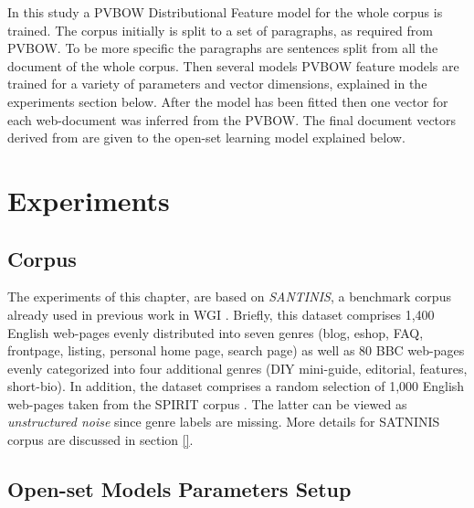 In this study a PVBOW Distributional Feature model for the whole corpus is trained. The corpus initially is split to a set of paragraphs, as required from PVBOW. To be more specific the paragraphs are sentences split from all the document of the whole corpus. Then several models PVBOW feature models are trained for a variety of parameters and vector dimensions, explained in the experiments section below. After the model has been fitted then one vector for each web-document was inferred from the PVBOW. The final document vectors derived from  are given to the open-set learning model explained below. 

\section{Experiments}\label{chap:word_embeddings:sec:experiments_setup}

\subsection{Corpus}\label{chap:word_embeddings:sec:experiments_corpora}

The experiments of this chapter, are based on \textit{SANTINIS}, a benchmark corpus already used in previous work in WGI \parencite{mehler2010genres_on_web,pritsos2018open,santini2007automatic}. Briefly, this dataset comprises 1,400 English web-pages evenly distributed into seven genres (blog, eshop, FAQ, frontpage, listing, personal home page, search page) as well as 80 BBC web-pages evenly categorized into four additional genres (DIY mini-guide, editorial, features, short-bio). In addition, the dataset comprises a random selection of 1,000 English web-pages taken from the SPIRIT corpus \parencite{joho2004spirit}. The latter can be viewed as \emph{unstructured noise} since genre labels are missing. More details for SATNINIS corpus are discussed in section \ref{}. 

%

\subsection{Open-set Models Parameters Setup}\label{chap:word_embeddings:sec:experiments_params}

